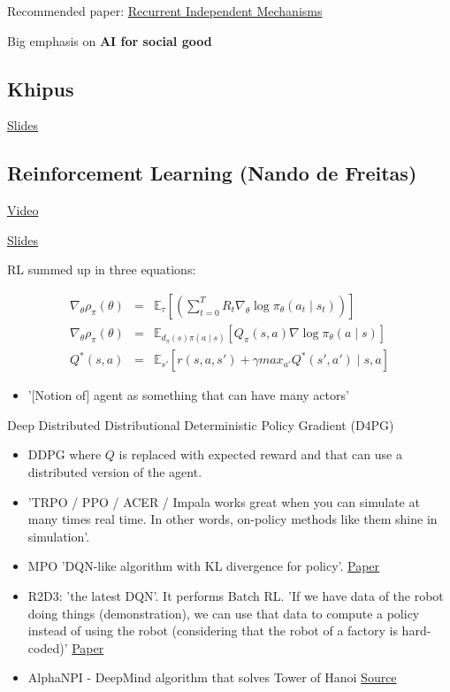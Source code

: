 \documentclass[12pt, english]{article}
\begin{document}
Recommended paper: \href{https://arxiv.org/abs/1909.10893}{Recurrent Independent Mechanisms}

Big emphasis on \textbf{AI for social good}


\subsection{Khipus}
\href{https://drive.google.com/open?id=1lxFmoJM-uJ5X6bB-ENs0zm9bpTLGzf51}{Slides}

\subsection{Reinforcement Learning (Nando de Freitas)}
\href{http://tv.vera.com.uy/video/55396}{Video}

\href{https://drive.google.com/file/d/1svTRtXbSTw-fa44YIbo97YliZmeFJ0ly/view?usp=sharing}{Slides}

RL summed up in three equations:

\begin{eqnarray}
  \nabla_\theta \rho_\pi (\theta) &=& \mathbb{E}_\tau [(\sum_{t=0}^T R_t \nabla_\theta \log \pi_\theta (a_t \mid s_t))] \\
  \nabla_\theta \rho_\pi (\theta) &=& \mathbb{E}_{d_\pi(s) \pi(a \mid s)} [Q_\pi(s,a) \nabla \log \pi_\theta (a \mid s)] \\
  Q^*(s,a) &=& \mathbb{E}_{s'} [r(s,a,s') + \gamma max_{a'} Q^*(s',a') \mid s,a]
\end{eqnarray}

\begin{itemize}
  \item '[Notion of] agent as something that can have many actors'
\end{itemize}

Deep Distributed Distributional Deterministic Policy Gradient (D4PG)
\begin{itemize}
  \item DDPG where $Q$ is replaced with expected reward and that can use a distributed version of the agent.
\end{itemize}

\begin{itemize}
  \item 'TRPO / PPO / ACER / Impala works great when you can simulate at many times real time. In other words, on-policy methods like them shine in simulation'.
  \item MPO 'DQN-like algorithm with KL divergence for policy'. \href{https://arxiv.org/abs/1809.05214}{Paper}
  \item R2D3: 'the latest DQN'. It performs Batch RL. 'If we have data of the robot doing things (demonstration), we can use that data to compute a policy instead of using the robot (considering that the robot of a factory is hard-coded)'
  \href{https://deepmind.com/research/publications/Making-Efficient-Use-of-Demonstrations-to-Solve-Hard-Exploration-Problems}{Paper}
  \item AlphaNPI - DeepMind algorithm that solves Tower of Hanoi
  \href{https://deepmind.com/research/publications/LearningCompositional-Neural-Programs-with-Recursive-Tree-Search-and-Planning}{Source}
\end{itemize}
\end{document}
